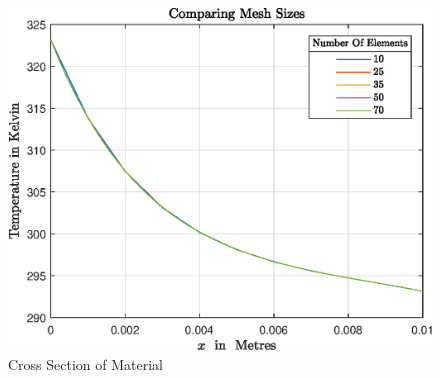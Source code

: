 \documentclass[11pt]{article}
\begin{document}
\begin{figure}[h!]
    \centering
    \includegraphics{epsMesh01}
    \caption{Cross Section of Material }\label{fig:fullviewmesh}
\end{figure}
\clearpage
\end{document}
